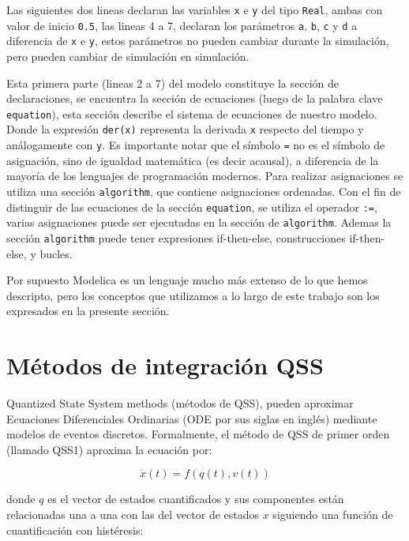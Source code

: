 	Las siguientes dos lineas declaran las variables \texttt{x} e \texttt{y} del tipo \texttt{Real}, ambas con valor de inicio \texttt{0.5}, las lineas 4 a 7, 
	declaran los parámetros \texttt{a}, \texttt{b}, \texttt{c} y \texttt{d} a diferencia de \texttt{x} e \texttt{y}, estos parámetros no pueden cambiar durante la 
	simulación, pero pueden cambiar de simulación en simulación.

	Esta primera parte (lineas 2 a 7) del modelo constituye la sección de declaraciones, se encuentra la sección de ecuaciones (luego de la palabra clave 
	\texttt{equation}), esta sección describe el sistema de ecuaciones de nuestro modelo. Donde la expresión \texttt{der(x)} representa la derivada \texttt{x} 
	respecto del tiempo y análogamente con \texttt{y}.
	Es importante notar que el símbolo \texttt{=} no es el símbolo de asignación, sino de igualdad matemática (es decir acausal), a diferencia de la mayoría 
	de  los lenguajes de programación modernos.  Para realizar asignaciones se utiliza una sección \texttt{algorithm}, que contiene asignaciones ordenadas. 
	Con el fin de distinguir de las ecuaciones de la sección \texttt{equation}, se utiliza el operador \texttt{:=}, 
	varias asignaciones puede ser ejecutadas en la sección de \texttt{algorithm}. Ademas la sección \texttt{algorithm} puede tener expresiones if-then-else, 
	construcciones if-then-else, y bucles.

	Por supuesto Modelica es un lenguaje mucho más extenso de lo que hemos descripto, pero los conceptos que utilizamos a lo largo de este trabajo son los
	expresados en la presente sección.



\section{Métodos de integración QSS}
	Quantized State System methods (métodos de QSS), pueden aproximar Ecuaciones Diferenciales Ordinarias (ODE por sus siglas en inglés) mediante modelos de 
	eventos discretos. Formalmente, el método de QSS de primer orden (llamado QSS1) aproxima la ecuación por:
	
	\begin{equation}
	\dot{x}(t) = f (q(t), v(t))
	\end{equation}
	
	donde $q$ es el vector de estados cuantificados y sus componentes están relacionadas una a una con las del vector de estados $x$ siguiendo una 
	función de cuantificación con histéresis:
	

